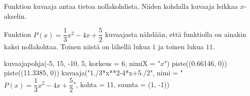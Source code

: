 Funktion kuvaaja antaa tietoa nollakohdista. Niiden kohdalla kuvaaja leikkaa $x$-akselin.

\begin{esimerkki}
Funktion $P(x) = \dfrac{1}{3}x^2-4x+\dfrac{5}{2}$ kuvaajasta nähdään, että funktiolla on ainakin kaksi nollakohtaa. Toinen niistä on lähellä lukua $1$ ja toinen lukua $11$.

\begin{kuva}
kuvaajapohja(-5, 15, -10, 5, korkeus = 6, nimiX = "$x$")
piste((0.66146, 0))
piste((11.3385, 0))
kuvaaja("1./3*x**2-4*x+5./2", nimi = "$P(x) = \dfrac{1}{3}x^2-4x+\dfrac{5}{2}$", kohta = 11, suunta = (1, -1))
\end{kuva}
\end{esimerkki}


%
%
%
%
%
%
%
%
%

